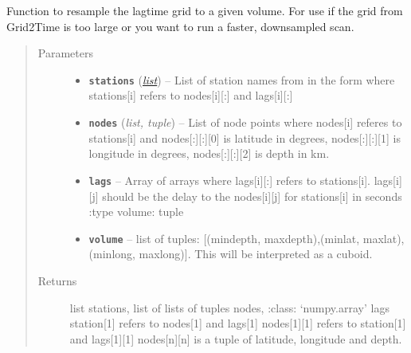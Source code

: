 \documentclass[a4paper,10pt,english]{sphinxmanual}
\begin{document}
\begin{fulllineitems}
\label{modules:bright_lights._resample_grid}
Function to resample the lagtime grid to a given volume.  For use if the
grid from Grid2Time is too large or you want to run a faster, downsampled
scan.
\begin{quote}\begin{description}
\item[{Parameters}] \leavevmode\begin{itemize}
\item {} 
\textbf{\texttt{stations}} (\href{https://docs.python.org/library/functions.html\#list}{\emph{list}}) -- List of station names from in the form where stations{[}i{]}    refers to nodes{[}i{]}{[}:{]} and lags{[}i{]}{[}:{]}

\item {} 
\textbf{\texttt{nodes}} (\emph{list, tuple}) -- List of node points where nodes{[}i{]} referes to stations{[}i{]} and    nodes{[}:{]}{[}:{]}{[}0{]} is latitude in degrees, nodes{[}:{]}{[}:{]}{[}1{]} is longitude in    degrees, nodes{[}:{]}{[}:{]}{[}2{]} is depth in km.

\item {} 
\textbf{\texttt{lags}} -- Array of arrays where lags{[}i{]}{[}:{]} refers to stations{[}i{]}.    lags{[}i{]}{[}j{]} should be the delay to the nodes{[}i{]}{[}j{]} for stations{[}i{]} in seconds    :type volume: tuple

\item {} 
\textbf{\texttt{volume}} -- list of tuples: {[}(mindepth, maxdepth),(minlat, maxlat),(minlong,    maxlong){]}.  This will be interpreted as a cuboid.

\end{itemize}

\item[{Returns}] \leavevmode
list stations, list of lists of tuples nodes, :class:     `numpy.array' lags station{[}1{]} refers to nodes{[}1{]} and lags{[}1{]}    nodes{[}1{]}{[}1{]} refers to station{[}1{]} and lags{[}1{]}{[}1{]}    nodes{[}n{]}{[}n{]} is a tuple of latitude, longitude and depth.

\end{description}\end{quote}

\end{fulllineitems}
\end{document}

